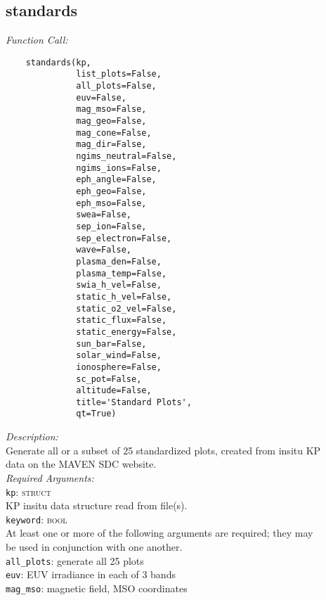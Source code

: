 \documentclass{article}
\begin{document}
\subsection{standards}
\label{subsec:standards}
\vspace{-5mm}
\textit{Function Call:}\\
\vspace{-10mm}
\begin{verbatim}
    standards(kp, 
              list_plots=False,
              all_plots=False,
              euv=False,
              mag_mso=False,
              mag_geo=False,
              mag_cone=False,
              mag_dir=False,
              ngims_neutral=False,
              ngims_ions=False,
              eph_angle=False,
              eph_geo=False,
              eph_mso=False,
              swea=False,
              sep_ion=False,
              sep_electron=False,
              wave=False,
              plasma_den=False,
              plasma_temp=False,
              swia_h_vel=False,
              static_h_vel=False,
              static_o2_vel=False,
              static_flux=False,
              static_energy=False,
              sun_bar=False,
              solar_wind=False,
              ionosphere=False,
              sc_pot=False,
              altitude=False,
              title='Standard Plots',
              qt=True)
\end{verbatim}
\vspace{-5mm}
\noindent
\textit{Description:}\\
\indent Generate all or a subset of 25 standardized plots, created from insitu KP\\
\indent data on the MAVEN SDC website.\\
\textit{Required Arguments:}\\
\indent \texttt{kp}: \textsc{struct}\\
\indent \indent KP insitu data structure read from file(s).\\ 
\indent \texttt{keyword}: \textsc{bool}\\
\indent \indent At least one or more of the following arguments are required; they may\\
\indent \indent be used in conjunction with one another.\\
\indent \indent \texttt{all\_plots}: generate all 25 plots\\
\indent \indent \texttt{euv}: EUV irradiance in each of 3 bands\\
\indent \indent \texttt{mag\_mso}: magnetic field, MSO coordinates\\
\end{document}
